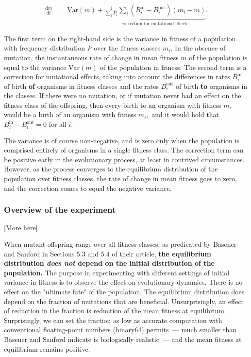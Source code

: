 \documentclass[11pt]{article}
\begin{document}
\begin{align*}
   \frac{\text{d}\bar{m}}{\text{d}t} 
      &= \text{Var}(m) 
         + \underbrace{\frac{1}{\sum_i P_i} \sum_i (B^\text{in}_i - B^\text{out}_i)(m_i - \bar{m})}_\text{correction for mutational effects}.
\end{align*}

The first term on the right-hand side is the variance in fitness of a
population with frequency distribution \(P\) over the fitness classes
\(m_i.\) In the absence of mutation, the instantaneous rate of change in
mean fitness \(\bar{m}\) of the population is equal to the variance
\(\text{Var}(m)\) of the population in fitness. The second term is a
correction for mutational effects, taking into account the differences
in rates \(B^\text{in}_i\) of birth \textbf{of} organisms in fitness
classes and the rates \(B^\text{out}_i\) of birth \textbf{to} organisms
in the classes. If there were no mutation, or if mutation never had an
effect on the fitness class of the offspring, then every birth to an
organism with fitness \(m_i\) would be a birth of an organism with
fitness \(m_i,\) and it would hold that
\(B_i^\text{in} - B_i^\text{out} = 0\) for all \(i.\)

The variance is of course non-negative, and is zero only when the
population is comprised entirely of organisms in a single fitness class.
The correction term can be positive early in the evolutionary process,
at least in contrived circumstances. However, as the process converges
to the equilibrium distribution of the population over fitness classes,
the rate of change in mean fitness goes to zero, and the correction
comes to equal the negative variance.

\subsubsection{Overview of the
experiment}\label{overview-of-the-experiment}

{[}{More here}{]}

When mutant offspring range over all fitness classes, as predicated by
Basener and Sanford in Sections 5.3 and 5.4 of their article,
\textbf{the equilibrium distribution \emph{does not} depend on the
initial distribution of the population.} The purpose in experimenting
with different settings of initial variance in fitness is to observe the
effect on evolutionary dynamics. There is no effect on the "ultimate
fate" of the population. The equilibrium distribution does depend on the
fraction of mutations that are beneficial. Unsurprisingly, an effect of
reduction in the fraction is reduction of the mean fitness at
equilibrium. Surprisingly, we can set the fraction as low as accurate
computation with conventional floating-point numbers (binary64)
permits~--- much smaller than Basener and Sanford indicate is
biologically realistic~--- and the mean fitness at equilibrium remains
positive.
\end{document}
